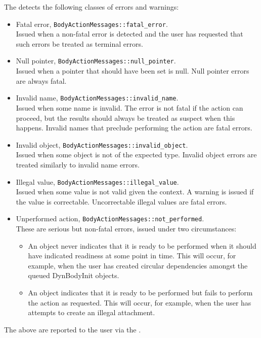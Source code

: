 \label{inspect:overview:messages}
The \ModelDesc detects the following classes of errors and warnings:
\begin{itemize}
\item Fatal error, \verb+BodyActionMessages::fatal_error+. \\
Issued when a non-fatal error is detected and the user has requested that such
errors be treated as terminal errors.
\item Null pointer, \verb+BodyActionMessages::null_pointer+. \\
Issued when a pointer that should have been set is null.
Null pointer errors are always fatal.
\item Invalid name, \verb+BodyActionMessages::invalid_name+.\\
Issued when some name is invalid.
The error is not fatal if the action can proceed,
but the results should always be treated as suspect when this happens.
Invalid names that preclude performing the action are fatal errors.
\item Invalid object, \verb+BodyActionMessages::invalid_object+. \\
Issued when some object is not of the expected type.
Invalid object errors are treated similarly to invalid name errors.
\item Illegal value, \verb+BodyActionMessages::illegal_value+. \\
Issued when some value is not valid given the context.
A warning is issued if the value is correctable.
Uncorrectable illegal values are fatal errors.
\item Unperformed action, \verb+BodyActionMessages::not_performed+. \\
These are serious but non-fatal errors, issued under two circumstances:
\begin{itemize}
\item An object never indicates that it is ready to be performed
when it should have indicated readiness at some point in time.
This will occur, for example, when the user has created circular
dependencies amongst the queued DynBodyInit objects.
\item An object indicates that it is ready to be performed
but fails to perform the action as requested.
This will occur, for example, when the user has attempts to create
an illegal attachment.
\end{itemize}
\end{itemize}
The above are reported to the user via the .

